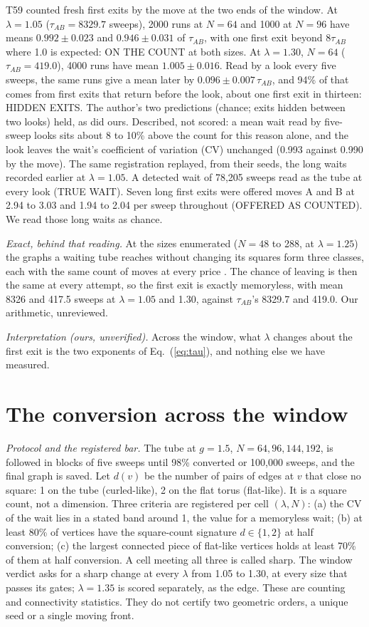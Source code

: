 \documentclass[aps,pre,10pt,twocolumn,superscriptaddress,nofootinbib]{revtex4-2}
\begin{document}
T59 counted fresh first exits by the move at the two ends of the window. At $\lambda=1.05$
($\tau_{AB}=8329.7$ sweeps), 2000 runs at $N=64$ and 1000 at $N=96$ have means $0.992\pm0.023$ and
$0.946\pm0.031$ of $\tau_{AB}$, with one first exit beyond $8\tau_{AB}$ where 1.0 is expected: ON THE COUNT at
both sizes. At $\lambda=1.30$, $N=64$ ($\tau_{AB}=419.0$), 4000 runs have mean $1.005\pm0.016$. Read by a look
every five sweeps, the same runs give a mean later by $0.096\pm0.007\,\tau_{AB}$, and 94\% of that comes from
first exits that return before the look, about one first exit in thirteen: HIDDEN EXITS. The author's two
predictions (chance; exits hidden between two looks) held, as did ours. Described, not scored: a mean wait read
by five-sweep looks sits about 8 to 10\% above the count for this reason alone, and the look leaves the wait's
coefficient of variation (CV) unchanged (0.993 against 0.990 by the move). The same registration replayed, from
their seeds, the long waits recorded earlier at $\lambda=1.05$. A detected wait of 78,205 sweeps read as the tube
at every look (TRUE WAIT). Seven long first exits were offered moves A and B at 2.94 to 3.03 and 1.94 to 2.04 per
sweep throughout (OFFERED AS COUNTED). We read those long waits as chance.

\emph{Exact, behind that reading.} At the sizes enumerated ($N=48$ to 288, at $\lambda=1.25$) the graphs a
waiting tube reaches without changing its squares form three classes, each with the same count of moves at
every price \cite{paper1}. The chance of leaving is then the same at every attempt, so the first exit is exactly
memoryless, with mean 8326 and 417.5 sweeps at $\lambda=1.05$ and 1.30, against $\tau_{AB}$'s 8329.7 and 419.0. Our arithmetic, unreviewed.

\emph{Interpretation (ours, unverified).} Across the window, what $\lambda$ changes about the first exit is the
two exponents of Eq.~(\ref{eq:tau}), and nothing else we have measured.

\section{The conversion across the window}
\label{sec:window}

\emph{Protocol and the registered bar.} The tube at $g=1.5$, $N=64,96,144,192$, is followed in blocks of five
sweeps until 98\% converted or 100,000 sweeps, and the final graph is saved. Let $d(v)$ be the number of pairs
of edges at $v$ that close no square: 1 on the tube (curled-like), 2 on the flat torus (flat-like). It is a
square count, not a dimension. Three criteria are registered per cell $(\lambda,N)$: (a) the CV of the wait
lies in a stated band around 1, the value for a memoryless wait; (b) at least 80\% of vertices
have the square-count signature $d\in\{1,2\}$ at half conversion; (c) the largest connected piece of flat-like
vertices holds at least 70\% of them at half conversion. A cell meeting all three is called sharp. The window
verdict asks for a sharp change at every $\lambda$ from 1.05 to 1.30, at every size that passes its gates;
$\lambda=1.35$ is scored separately, as the edge. These are counting and connectivity statistics. They do not certify two geometric
orders, a unique seed or a single moving front.
\end{document}
